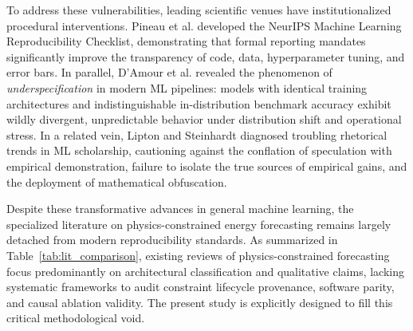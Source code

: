 \documentclass[preprint,3p,times]{elsarticle}
\begin{document}
To address these vulnerabilities, leading scientific venues have institutionalized procedural interventions. Pineau et al. \cite{pineau2021} developed the NeurIPS Machine Learning Reproducibility Checklist, demonstrating that formal reporting mandates significantly improve the transparency of code, data, hyperparameter tuning, and error bars. In parallel, D'Amour et al. \cite{damour2022} revealed the phenomenon of \textit{underspecification} in modern ML pipelines: models with identical training architectures and indistinguishable in-distribution benchmark accuracy exhibit wildly divergent, unpredictable behavior under distribution shift and operational stress. In a related vein, Lipton and Steinhardt \cite{lipton2019} diagnosed troubling rhetorical trends in ML scholarship, cautioning against the conflation of speculation with empirical demonstration, failure to isolate the true sources of empirical gains, and the deployment of mathematical obfuscation. 

Despite these transformative advances in general machine learning, the specialized literature on physics-constrained energy forecasting remains largely detached from modern reproducibility standards. As summarized in Table~\ref{tab:lit_comparison}, existing reviews of physics-constrained forecasting focus predominantly on architectural classification and qualitative claims, lacking systematic frameworks to audit constraint lifecycle provenance, software parity, and causal ablation validity. The present study is explicitly designed to fill this critical methodological void.
\end{document}
